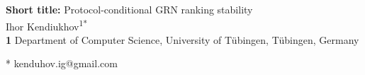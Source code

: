\documentclass[10pt,letterpaper]{article}
\begin{document}
\vspace*{0.2in}

\begin{flushleft}
{\Large
\textbf{}
}
\newline
\textbf{Short title:} Protocol-conditional GRN ranking stability
\newline
\\
Ihor Kendiukhov\textsuperscript{1*}
\\
\bigskip
\textbf{1} Department of Computer Science, University of T\"ubingen, T\"ubingen, Germany
\\
\bigskip

* kenduhov.ig@gmail.com

\end{flushleft}

\clearpage
\linenumbers
\end{document}
